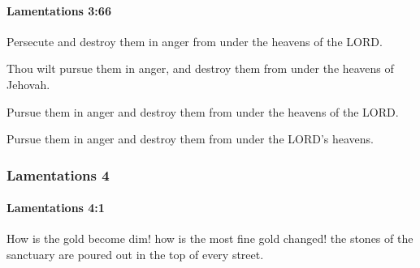 		\paragraph{Lamentations 3:66} %
			\label{LAMENTATIONS-3-66}

			Persecute and destroy them in anger from under the heavens of the LORD.

			\begin{versebox}
					\item[BHS] 
					\item[LXX] 
					\item[ASV] Thou wilt pursue them in anger, and destroy them from under the heavens of Jehovah.
					\item[NIV] Pursue them in anger and destroy them from under the heavens of the LORD.
					\item[NRSV] Pursue them in anger and destroy them from under the LORD’s heavens.
			\end{versebox}
	\subsubsection{Lamentations 4} %
		\label{LAMENTATIONS-4}

		\paragraph{Lamentations 4:1} %
			\label{LAMENTATIONS-4-1}

			How is the gold become dim! how is the most fine gold changed! the stones of the sanctuary are poured out in the top of every street.

